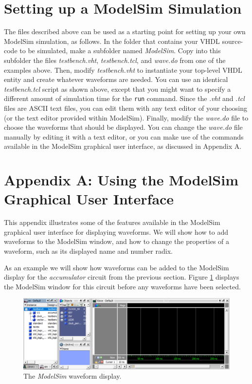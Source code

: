 \documentclass[11pt, twoside, pdftex]{article}
\begin{document}
\section{Setting up a ModelSim Simulation}

The files described above can be used as a starting point for setting up your own ModelSim 
simulation, as follows.  In the folder that contains your VHDL source-code to be
simulated, make a subfolder named {\it ModelSim}. 
Copy into this subfolder the files {\it testbench.vht},
{\it testbench.tcl}, and {\it wave.do} from one of the examples above. Then, 
modify {\it testbench.vht} to instantiate your top-level VHDL entity and create whatever 
waveforms are needed. You can use an identical {\it testbench.tcl} script as shown above, 
except that you might want to specify a different amount of simulation time for 
the \texttt{run} command. Since the .{\it vht} and .{\it tcl} files are ASCII text
files, you can edit them with any text editor of your choosing (or the text editor
provided within ModelSim). Finally, 
modify the {\it wave.do} file to choose the waveforms that should be displayed.
You can change the {\it wave.do} file manually by editing it with a text editor, or you can 
make use of the commands available in the ModelSim graphical user interface, 
as discussed in Appendix A.

\newpage
\section*{Appendix A: Using the ModelSim Graphical User Interface}

This appendix illustrates some of the features available in the ModelSim graphical user
interface for displaying waveforms. We will show how to add waveforms to the ModelSim
window, and how to change the properties of a waveform, such as its displayed name 
and number radix.

As an example we will show how waveforms can be added to the ModelSim display for the
{\it accumulator} circuit from the previous section. Figure \ref{fig:appa_fig1} displays the 
ModelSim window for this circuit before any waveforms have been selected.

\begin{figure}[h!]
	\begin{center}
		\includegraphics[width = \textwidth]{figures/appa_fig1.png}
	\end{center}
		  \caption{The {\it ModelSim} waveform display.}
	\label{fig:appa_fig1}
\end{figure}
\end{document}
